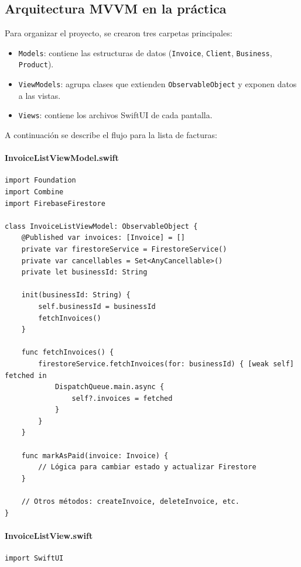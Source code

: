 \subsection{Arquitectura MVVM en la práctica}

\begin{large}

Para organizar el proyecto, se crearon tres carpetas principales:

\begin{itemize}
  \item \texttt{Models}: contiene las estructuras de datos (\texttt{Invoice}, \texttt{Client}, \texttt{Business}, \texttt{Product}).
  \item \texttt{ViewModels}: agrupa clases que extienden \texttt{ObservableObject} y exponen datos a las vistas.
  \item \texttt{Views}: contiene los archivos SwiftUI de cada pantalla.
\end{itemize}

A continuación se describe el flujo para la lista de facturas:

\paragraph{InvoiceListViewModel.swift}
\begin{verbatim}
import Foundation
import Combine
import FirebaseFirestore

class InvoiceListViewModel: ObservableObject {
    @Published var invoices: [Invoice] = []
    private var firestoreService = FirestoreService()
    private var cancellables = Set<AnyCancellable>()
    private let businessId: String

    init(businessId: String) {
        self.businessId = businessId
        fetchInvoices()
    }

    func fetchInvoices() {
        firestoreService.fetchInvoices(for: businessId) { [weak self] fetched in
            DispatchQueue.main.async {
                self?.invoices = fetched
            }
        }
    }

    func markAsPaid(invoice: Invoice) {
        // Lógica para cambiar estado y actualizar Firestore
    }

    // Otros métodos: createInvoice, deleteInvoice, etc.
}
\end{verbatim}

\paragraph{InvoiceListView.swift}
\begin{verbatim}
import SwiftUI


\end{verbatim}
\end{large}
